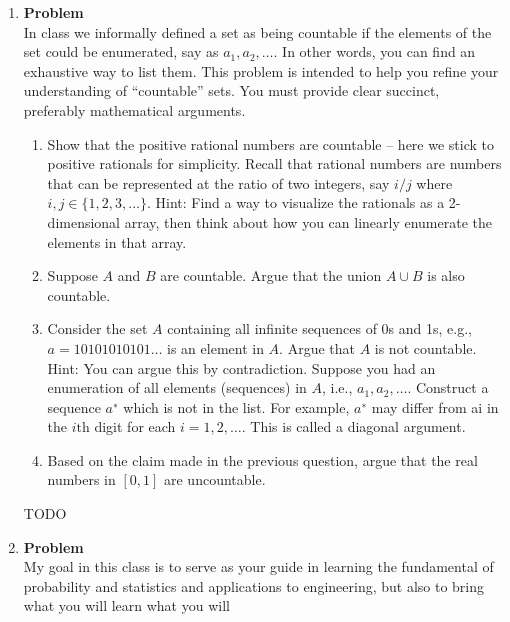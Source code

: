 \documentclass[12pt]{article}
\newenvironment{Ex}{\textbf{Problem}\vspace{.75em}\\}{}
\begin{document}
\begin{enumerate}
\begin{Ex}
\begin{solution}
\begin{enumerate}
      \end{enumerate}
    \end{solution}
  \end{Ex}
\item 
  \begin{Ex}
    In class we informally defined a set as being countable if the
    elements of the set could be enumerated, say as
    $a_1,a_2,\ldots$. In other words, you can find an exhaustive way
    to list them. This problem is intended to help you refine your
    understanding of ``countable'' sets. You must provide clear
    succinct, preferably mathematical arguments.
    \begin{enumerate}
    \item Show that the positive rational numbers are countable – here
      we stick to positive rationals for simplicity. Recall that
      rational numbers are numbers that can be represented at the
      ratio of two integers, say $i/j$ where $i, j \in \{1, 2, 3,
      \ldots\}$. Hint: Find a way to visualize the rationals as a
      2-dimensional array, then think about how you can linearly
      enumerate the elements in that array.
    \item Suppose $A$ and $B$ are countable. Argue that the union $A
      \cup B$ is also countable.
    \item Consider the set $A$ containing all infinite sequences of 0s
      and 1s, e.g., $a = 10101010101\ldots$ is an element in
      $A$. Argue that $A$ is not countable. Hint: You can argue this
      by contradiction. Suppose you had an enumeration of all elements
      (sequences) in $A$, i.e., $a_1, a_2,\ldots$. Construct a
      sequence $a^∗$ which is not in the list. For example, $a^∗$ may
      differ from ai in the $i\text{th}$ digit for each $i = 1, 2,
      \ldots$. This is called a diagonal argument.
    \item Based on the claim made in the previous question, argue that
      the real numbers in $[0, 1]$ are uncountable.
    \end{enumerate}
    \begin{solution} \hfill
      {\huge TODO}
    \end{solution}
  \end{Ex}
\item 
  \begin{Ex}
    My goal in this class is to serve as your guide in learning the
    fundamental of probability and statistics and applications to
    engineering, but also to bring what you will learn what you will

\end{Ex}
\end{enumerate}
\end{document}
